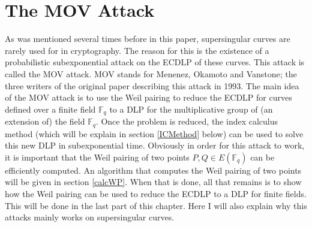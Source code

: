 \documentclass{article}
\numberwithin{equation}{section}
\theoremstyle{definition}
\newcommand{\FF}[1]{{\mathbb F}_{#1}} %
\begin{document}
\section{The MOV Attack}\label{MOV}
As was mentioned several times before in this paper, supersingular curves are rarely used for in cryptography. The reason for this is the existence of a probabilistic subexponential attack on the ECDLP of these curves. This attack is called the MOV attack. MOV stands for Menenez, Okamoto and Vanstone; the three writers of the original paper \cite{MOVattack} describing this attack in 1993. The main idea of the MOV attack is to use the Weil pairing to reduce the ECDLP for curves defined over a finite field $\FF{q}$ to a DLP for the multiplicative group of (an extension of) the field $\FF{q}$. Once the problem is reduced, the index calculus method (which will be explain in section \ref{ICMethod} below) can be used to solve this new DLP in subexponential time. Obviously in order for this attack to work, it is important that the Weil pairing of two points $P,Q \in E(\FF{q})$ can be efficiently computed. An algorithm that computes the Weil pairing of two points will be given in section \ref{calcWP}. When that is done, all that remains is to show how the Weil pairing can be used to reduce the ECDLP to a DLP for finite fields. This will be done in the last part of this chapter. Here I will also explain why this attacks mainly works on supersingular curves.   
\end{document}
